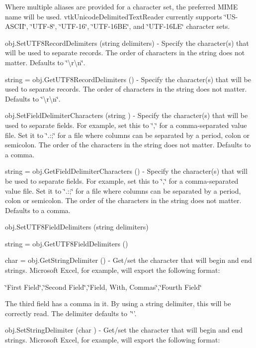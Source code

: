 \begin{DoxyItemize}
Where multiple aliases are provided for a character set, the preferred M\-I\-M\-E name will be used. vtk\-Unicode\-Delimited\-Text\-Reader currently supports \char`\"{}\-U\-S-\/\-A\-S\-C\-I\-I\char`\"{}, \char`\"{}\-U\-T\-F-\/8\char`\"{}, \char`\"{}\-U\-T\-F-\/16\char`\"{}, \char`\"{}\-U\-T\-F-\/16\-B\-E\char`\"{}, and \char`\"{}\-U\-T\-F-\/16\-L\-E\char`\"{} character sets.  
\item {\ttfamily obj.\-Set\-U\-T\-F8\-Record\-Delimiters (string delimiters)} -\/ Specify the character(s) that will be used to separate records. The order of characters in the string does not matter. Defaults to \char`\"{}\textbackslash{}r\textbackslash{}n\char`\"{}.  
\item {\ttfamily string = obj.\-Get\-U\-T\-F8\-Record\-Delimiters ()} -\/ Specify the character(s) that will be used to separate records. The order of characters in the string does not matter. Defaults to \char`\"{}\textbackslash{}r\textbackslash{}n\char`\"{}.  
\item {\ttfamily obj.\-Set\-Field\-Delimiter\-Characters (string )} -\/ Specify the character(s) that will be used to separate fields. For example, set this to \char`\"{},\char`\"{} for a comma-\/separated value file. Set it to \char`\"{}.\-:;\char`\"{} for a file where columns can be separated by a period, colon or semicolon. The order of the characters in the string does not matter. Defaults to a comma.  
\item {\ttfamily string = obj.\-Get\-Field\-Delimiter\-Characters ()} -\/ Specify the character(s) that will be used to separate fields. For example, set this to \char`\"{},\char`\"{} for a comma-\/separated value file. Set it to \char`\"{}.\-:;\char`\"{} for a file where columns can be separated by a period, colon or semicolon. The order of the characters in the string does not matter. Defaults to a comma.  
\item {\ttfamily obj.\-Set\-U\-T\-F8\-Field\-Delimiters (string delimiters)}  
\item {\ttfamily string = obj.\-Get\-U\-T\-F8\-Field\-Delimiters ()}  
\item {\ttfamily char = obj.\-Get\-String\-Delimiter ()} -\/ Get/set the character that will begin and end strings. Microsoft Excel, for example, will export the following format\-:

\char`\"{}\-First Field\char`\"{},\char`\"{}\-Second Field\char`\"{},\char`\"{}\-Field, With, Commas\char`\"{},\char`\"{}\-Fourth Field\char`\"{}

The third field has a comma in it. By using a string delimiter, this will be correctly read. The delimiter defaults to '\char`\"{}'.  
\item {\ttfamily obj.\-Set\-String\-Delimiter (char )} -\/ Get/set the character that will begin and end strings. Microsoft Excel, for example, will export the following format\-:


\end{DoxyItemize}
